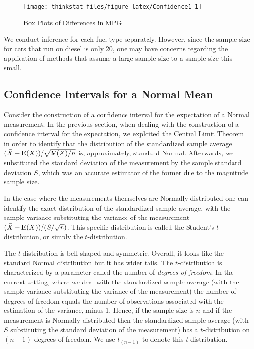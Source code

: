 \documentclass[]{krantz}
\newcommand{\Expec}{{\rm I\kern-.3em E}}
\newcommand{\Var}{{\rm I\kern-.3em V}}
\theoremstyle{definition}
\theoremstyle{definition}
\theoremstyle{definition}
\theoremstyle{remark}
\begin{document}
\begin{figure}

{\centering \texttt{[image: thinkstat\_files/figure-latex/Confidence1-1]} 

}

\caption{Box Plots of Differences in MPG}\label{fig:Confidence1}
\end{figure}

We conduct inference for each fuel type separately. However, since the
sample size for cars that run on diesel is only 20, one may have
concerns regarding the application of methods that assume a large sample
size to a sample size this small.

\subsection{Confidence Intervals for a Normal
Mean}\label{confidence-intervals-for-a-normal-mean}

Consider the construction of a confidence interval for the expectation
of a Normal measurement. In the previous section, when dealing with the
construction of a confidence interval for the expectation, we exploited
the Central Limit Theorem in order to identify that the distribution of
the standardized sample average
\((\bar X - \Expec(X))/\sqrt{\Var(X)/n}\) is, approximately, standard
Normal. Afterwards, we substituted the standard deviation of the
measurement by the sample standard deviation \(S\), which was an
accurate estimator of the former due to the magnitude sample size.

In the case where the measurements themselves are Normally distributed
one can identify the exact distribution of the standardized sample
average, with the sample variance substituting the variance of the
measurement: \((\bar X - \Expec(X))/(S/\sqrt{n})\). This specific
distribution is called the Student's \(t\)-distribution, or simply the
\(t\)-distribution.

The \(t\)-distribution is bell shaped and symmetric. Overall, it looks
like the standard Normal distribution but it has wider tails. The
\(t\)-distribution is characterized by a parameter called the number of
\emph{degrees of freedom}. In the current setting, where we deal with
the standardized sample average (with the sample variance substituting
the variance of the measurement) the number of degrees of freedom equals
the number of observations associated with the estimation of the
variance, minus 1. Hence, if the sample size is \(n\) and if the
measurement is Normally distributed then the standardized sample average
(with \(S\) substituting the standard deviation of the measurement) has
a \(t\)-distribution on \((n-1)\) degrees of freedom. We use
\(t_{(n-1)}\) to denote this \(t\)-distribution.
\end{document}
